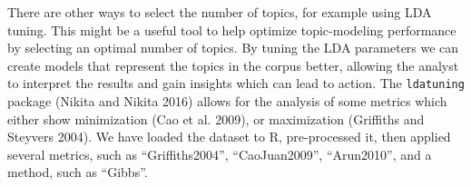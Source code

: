 There are other ways to select the number of topics, for example using
LDA tuning. This might be a useful tool to help optimize topic-modeling
performance by selecting an optimal number of topics. By tuning the LDA
parameters we can create models that represent the topics in the
corpus better, allowing the analyst to interpret the results and gain insights which can lead to action. The \texttt{ldatuning} package (Nikita and Nikita
2016) allows for the analysis of some metrics which either show minimization
(Cao et al. 2009), or maximization (Griffiths and Steyvers 2004). We have
loaded the dataset to R, pre-processed it, then applied several
metrics, such as ``Griffiths2004'', ``CaoJuan2009'', ``Arun2010'', and a
method, such as ``Gibbs''.

\begin{Shaded}
\begin{Highlighting}[]
\NormalTok{(} \NormalTok{)}

\OtherTok{\textless{}{-}} \NormalTok{(}\NormalTok{)}


\OtherTok{\textless{}{-}}\NormalTok{ prodreviews[, }\NormalTok{(}\NormalTok{, }\NormalTok{, }\NormalTok{, }\NormalTok{)]}

\SpecialCharTok{$}\OtherTok{\textless{}{-}} \SpecialCharTok{$}

\OtherTok{\textless{}{-}}\SpecialCharTok{\%\textgreater{}\%} \NormalTok{(}\SpecialCharTok{==} \NormalTok{)}

\SpecialCharTok{$}\OtherTok{\textless{}{-}} \NormalTok{(}\SpecialCharTok{$}\NormalTok{))}

\OtherTok{\textless{}{-}} \SpecialCharTok{==}  \SpecialCharTok{|}\SpecialCharTok{==} \NormalTok{)}


\end{Highlighting}
\end{Shaded}
